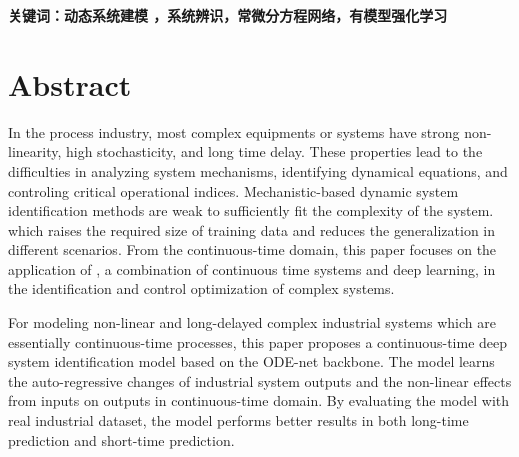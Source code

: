 \vskip 30bp
{

    \textbf{ \heiti {} 关键词：动态系统建模 ，系统辨识，常微分方程网络，有模型强化学习}
}



\chapter*{ Abstract }
In the process industry, most complex equipments or systems have strong non-linearity, high stochasticity, and long time delay.
These properties lead to the difficulties in analyzing system mechanisms, identifying dynamical equations, and controling critical operational indices. 
Mechanistic-based dynamic system identification methods are weak to sufficiently fit the complexity of the system.
which raises the required size of training data and reduces the generalization in different scenarios.
From the continuous-time domain, this paper focuses on the application of , a combination of continuous time systems and deep learning, in the identification and control optimization of complex systems.

For modeling non-linear and long-delayed complex industrial systems which are essentially continuous-time processes, this paper proposes a continuous-time deep system identification model based on the ODE-net backbone.
The model learns the auto-regressive changes of industrial system outputs and the non-linear effects from inputs on outputs in continuous-time domain. 
By evaluating the model with real industrial dataset, the model performs better results in both long-time prediction and short-time prediction.   


